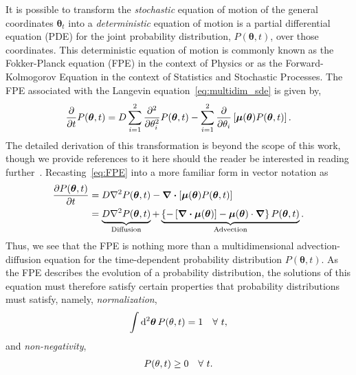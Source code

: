 \documentclass[11pt]{article}
\begin{document}
It is possible to transform the \emph{stochastic} equation of motion of the general coordinates $\bm{\theta}_{t}$ into a \emph{deterministic} equation of motion is a partial differential equation (PDE) for the joint probability distribution, $P(\bm{\theta},t)$, over those coordinates. This deterministic equation of motion is commonly known as the Fokker-Planck equation (FPE) in the context of Physics or as the Forward-Kolmogorov Equation in the context of Statistics and Stochastic Processes. The FPE associated with the Langevin equation~\eqref{eq:multidim_sde} is given by,
\begin{align}
    \frac{\partial}{\partial t} P(\bm{\theta}, t) =  D\sum_{i=1}^{2}\pdv[2]{}{\theta_{i}} P(\bm{\theta}, t) -\sum_{i=1}^{2}\pdv{}{\theta_{i}}\left[\bm{\mu}(\bm{\theta})P(\bm{\theta}, t)\right]. \label{eq:FPE}
\end{align}
The detailed derivation of this transformation is beyond the scope of this work, though we provide references to it here should the reader be interested in reading further~\cite{van2011stochastic,risken_fpe,jacobs_stochastic}. 
Recasting~\eqref{eq:FPE} into a more familiar form in vector notation as 
\begin{subequations}
     \label{eq:FPE_vec}
    \begin{align}
       \pdv{P(\bm{\theta}, t)}{t} &=  D\laplacian{P(\bm{\theta},t)} -\div{\left[\bm{\mu}(\bm{\theta})P(\bm{\theta},t)\right]} \\
        &= \underbrace{D\laplacian{{P(\bm{\theta},t)}}}_{\text{Diffusion}} +  \underbrace{\left\{-\left[\div{\bm{\mu}(\bm{\theta})}\right] - \bm{\mu}(\bm{\theta})\cdot\grad\right\}P(\bm{\theta},t)}_{\text{Advection}}.
    \end{align}
\end{subequations}
Thus, we see that the FPE is nothing more than a multidimensional advection-diffusion equation for the time-dependent probability distribution $P(\bm{\theta},t)$. As the FPE describes the evolution of a probability distribution, the solutions of this equation must therefore satisfy certain properties that probability distributions must satisfy, namely, \emph{normalization},
\begin{align}
    \int\dd[2]{\bm{\theta}} P(\vb{\theta},t) = 1\quad\forall\ t,\label{eq:prob_norm}
\end{align}
and \emph{non-negativity},
\begin{align}
    P(\vb{\theta},t) \ge 0\quad\forall\ t.\label{eq:nonnegativity}
\end{align}
\end{document}
